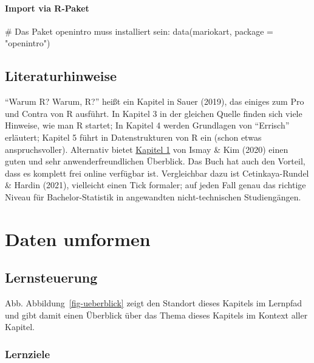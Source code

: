 \documentclass[
  letterpaper,
]{scrbook}
\newenvironment{Shaded}{\begin{snugshade}}{\end{snugshade}}
\newcommand{\AttributeTok}[1]{\textcolor[rgb]{0.40,0.45,0.13}{#1}}
\newcommand{\CommentTok}[1]{\textcolor[rgb]{0.37,0.37,0.37}{#1}}
\newcommand{\FunctionTok}[1]{\textcolor[rgb]{0.28,0.35,0.67}{#1}}
\newcommand{\NormalTok}[1]{\textcolor[rgb]{0.00,0.23,0.31}{#1}}
\newcommand{\StringTok}[1]{\textcolor[rgb]{0.13,0.47,0.30}{#1}}
\theoremstyle{definition}
\theoremstyle{definition}
\theoremstyle{definition}
\theoremstyle{remark}
\begin{document}
\subsubsection{Import via R-Paket}\label{import-via-r-paket}

\begin{Shaded}
\begin{Highlighting}[]
\CommentTok{\# Das Paket \textquotesingle{}openintro\textquotesingle{} muss installiert sein:}
\FunctionTok{data}\NormalTok{(mariokart, }\AttributeTok{package =} \StringTok{"openintro"}\NormalTok{) }
\end{Highlighting}
\end{Shaded}

\section{Literaturhinweise}\label{literaturhinweise-1}

\enquote{Warum R? Warum, R?} heißt ein Kapitel in Sauer (2019), das
einiges zum Pro und Contra von R ausführt. In Kapitel 3 in der gleichen
Quelle finden sich viele Hinweise, wie man R startet; In Kapitel 4
werden Grundlagen von \enquote{Errisch} erläutert; Kapitel 5 führt in
Datenstrukturen von R ein (schon etwas anspruchsvoller). Alternativ
bietet \href{https://moderndive.com/1-getting-started.html}{Kapitel 1}
von Ismay \& Kim (2020) einen guten und sehr anwenderfreundlichen
Überblick. Das Buch hat auch den Vorteil, dass es komplett frei online
verfügbar ist. Vergleichbar dazu ist Cetinkaya-Rundel \& Hardin (2021),
vielleicht einen Tick formaler; auf jeden Fall genau das richtige Niveau
für Bachelor-Statistik in angewandten nicht-technischen Studiengängen.

\chapter{Daten umformen}\label{daten-umformen}

\section{Lernsteuerung}\label{lernsteuerung-2}

Abb. Abbildung~\ref{fig-ueberblick} zeigt den Standort dieses Kapitels
im Lernpfad und gibt damit einen Überblick über das Thema dieses
Kapitels im Kontext aller Kapitel.

\subsection{Lernziele}\label{lernziele-3}
\end{document}
